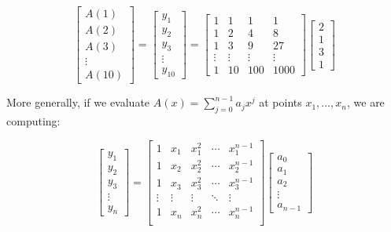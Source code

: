 \documentclass[11  pt]{article}
\begin{document}
\begin{equation*}
\begin{bmatrix}
        A(1) \\ A(2) \\ A(3) \\ \vdots \\ A(10)
    \end{bmatrix}
		=
    \begin{bmatrix}
        y_1 \\ y_2 \\ y_3 \\ \vdots \\ y_{10}
    \end{bmatrix}
    =
    \begin{bmatrix}
        1 & 1 & 1 & 1 \\
        1 & 2 & 4 & 8 \\
        1 & 3 & 9 & 27 \\
        \vdots & \vdots & \vdots & \vdots \\
        1 & 10 & 100 & 1000
    \end{bmatrix}
    \begin{bmatrix}
        2 \\ 1 \\ 3 \\ 1
    \end{bmatrix}
\end{equation*}

More generally, if we evaluate $A(x) = \sum_{j=0}^{n-1} a_j x^j$ at points $x_1,\ldots,x_n$, we are computing:

\begin{equation*}
    \begin{bmatrix}
        y_1 \\ y_2 \\ y_3 \\ \vdots \\ y_n
    \end{bmatrix}
    =
    \begin{bmatrix}
        1 & x_1 & x_1^2 & \cdots & x_1^{n-1} \\
				1 & x_2 & x_2^2 & \cdots & x_2^{n-1} \\
				1 & x_3 & x_3^2 & \cdots & x_3^{n-1} \\
        \vdots & \vdots & \vdots & \ddots & \vdots \\
        1 & x_n & x_n^2 & \cdots & x_n^{n-1} \\
    \end{bmatrix}
    \begin{bmatrix}
        a_0 \\ a_1 \\ a_2 \\ \vdots \\ a_{n-1}
    \end{bmatrix}
\end{equation*}
\end{document}
